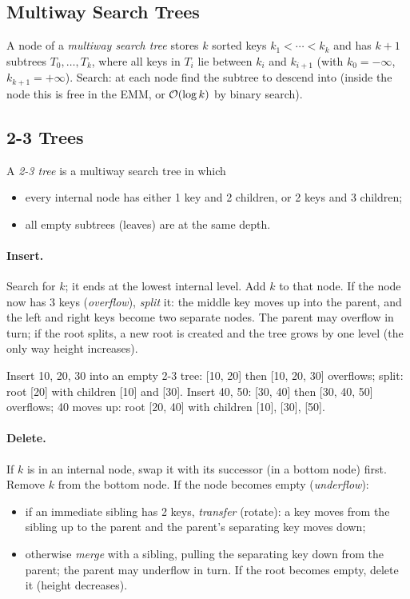 \subsection{Multiway Search Trees}

A node of a \emph{multiway search tree} stores $k$ sorted keys
$k_1 < \cdots < k_k$ and has $k + 1$ subtrees $T_0, \ldots, T_k$, where all keys
in $T_i$ lie between $k_i$ and $k_{i+1}$ (with $k_0 = -\infty$, $k_{k+1} = +\infty$).
Search: at each node find the subtree to descend into (inside the node this is
free in the EMM, or $\mathcal{O}(\log k)$ by binary search).

\subsection{2-3 Trees}

\begin{definition}
A \emph{2-3 tree} is a multiway search tree in which
\begin{itemize}
  \item every internal node has either 1 key and 2 children, or 2 keys and 3
        children;
  \item all empty subtrees (leaves) are at the same depth.
\end{itemize}
\end{definition}

\paragraph{Insert.} Search for $k$; it ends at the lowest internal level. Add $k$
to that node. If the node now has 3 keys (\emph{overflow}), \emph{split} it: the
middle key moves up into the parent, and the left and right keys become two
separate nodes. The parent may overflow in turn; if the root splits, a new root
is created and the tree grows by one level (the only way height increases).

\begin{example}
Insert 10, 20, 30 into an empty 2-3 tree: [10, 20] then [10, 20, 30] overflows;
split: root [20] with children [10] and [30]. Insert 40, 50: [30, 40] then
[30, 40, 50] overflows; 40 moves up: root [20, 40] with children [10], [30], [50].
\end{example}

\paragraph{Delete.} If $k$ is in an internal node, swap it with its successor (in
a bottom node) first. Remove $k$ from the bottom node. If the node becomes
empty (\emph{underflow}):
\begin{itemize}
  \item if an immediate sibling has 2 keys, \emph{transfer} (rotate): a key moves
        from the sibling up to the parent and the parent's separating key moves
        down;
  \item otherwise \emph{merge} with a sibling, pulling the separating key down
        from the parent; the parent may underflow in turn. If the root becomes
        empty, delete it (height decreases).
\end{itemize}

